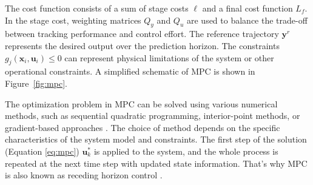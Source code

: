 The cost function consists of a sum of stage costs $\ell$ and a final cost function $L_f$. In the stage cost, weighting matrices $Q_y$ and $Q_u$ are used to balance the trade-off between tracking performance and control effort. The reference trajectory $\boldsymbol{y}^r$ represents the desired output over the prediction horizon. The constraints $g_j(\boldsymbol{x}_i, \boldsymbol{u}_i)\leq 0$ can represent physical limitations of the system or other operational constraints. A simplified schematic of \ac{MPC} is shown in Figure~\ref{fig:mpc}. 

The optimization problem in \ac{MPC} can be solved using various numerical methods, such as sequential quadratic programming, interior-point methods, or gradient-based approaches \citep{Diehl2013}. The choice of method depends on the specific characteristics of the system model and constraints. The first step of the solution (Equation \ref{eq:mpc}) $\boldsymbol{u}^*_k$ is applied to the system, and the whole process is repeated at the next time step with updated state information. That's why \ac{MPC} is also known as receding horizon control \citep{Christophersen2007}.

